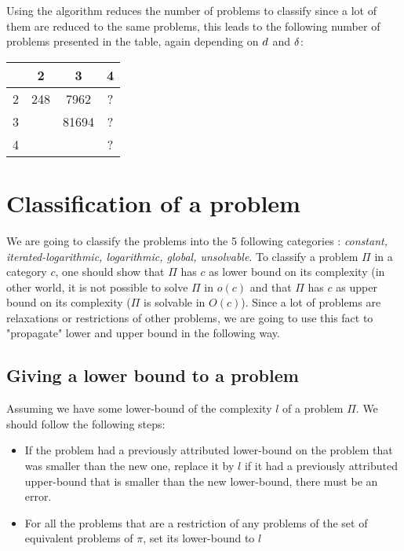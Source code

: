 Using the algorithm reduces the number of problems to classify since a lot of them are reduced to the same problems, this leads to the following number of problems presented in the table, again depending on $\wdd$ and $\bdd$:
\begin{center}
\begin{tabular}{ | c | c | c | c |}
 \hline
 \diagbox{$\wdd$}{$\bdd$} & 2 & 3 & 4 \\ 
 \hline
 2 & 248 & 7962 & ?\\
 \hline
 3 &  & 81694 & ?\\
 \hline
 4 &  &  &  ?\\
\hline
\end{tabular}
\end{center}


\section{Classification of a problem}
We are going to classify the problems into the 5 following categories : \textit{constant, iterated-logarithmic, logarithmic, global, unsolvable}. To classify a problem $\Pi$ in a category $c$, one should show that $\Pi$  has $c$ as lower bound on its complexity (in other world, it is not possible to solve $\Pi$ in $o(c)$ and that $\Pi$ has $c$ as upper bound on its complexity ($\Pi$ is solvable in $O(c)$). Since a lot of problems are relaxations or restrictions of other problems, we are going to use this fact to "propagate" lower and upper bound in the following way.
\subsection{Giving a lower bound to a problem}
Assuming we have some lower-bound of the complexity $l$ of a problem $\Pi$. We should follow the following steps:
\begin{itemize}
    \item If the problem had a previously attributed lower-bound on the problem that was smaller than the new one, replace it by $l$ if it had a previously attributed upper-bound that is smaller than the new lower-bound, there must be an error.
    \item For all the problems that are a restriction of any problems of the set of equivalent problems of $\pi$, set its lower-bound to $l$
\end{itemize}
